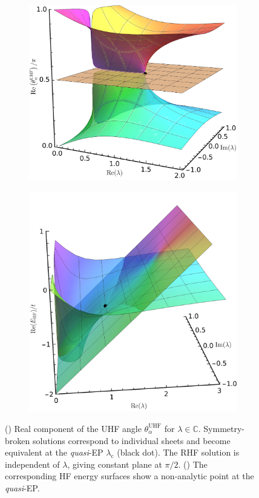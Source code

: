 \documentclass[aps,prb,reprint,noshowkeys,superscriptaddress]{revtex4-1}
\newcommand{\ta}{\theta_{\alpha}}
\newcommand{\bbC}{\mathbb{C}}
\begin{document}
\begin{figure}[t]
	\begin{subfigure}{0.49\textwidth}
    \includegraphics[height=0.65\textwidth,trim={0pt 0pt 0pt -35pt},clip]{HF_cplx_angle}
	\subcaption{\label{subfig:UHF_cplx_angle}}
    \end{subfigure}
	\begin{subfigure}{0.49\textwidth}
	\includegraphics[height=0.65\textwidth]{HF_cplx_energy}
	\subcaption{\label{subfig:UHF_cplx_energy}}
    \end{subfigure}
	\caption{%
    () Real component of the UHF angle $\ta^{\text{UHF}}$ for $\lambda \in \bbC$.
    Symmetry-broken solutions correspond to individual sheets and become equivalent at 
    the \textit{quasi}-EP $\lambda_{\text{c}}$ (black dot).
    The RHF solution is independent of $\lambda$, giving constant plane at $\pi/2$.
    () The corresponding HF energy surfaces show a non-analytic 
    point at the \textit{quasi}-EP.
	\label{fig:HF_cplx}}
\end{figure}
\end{document}
